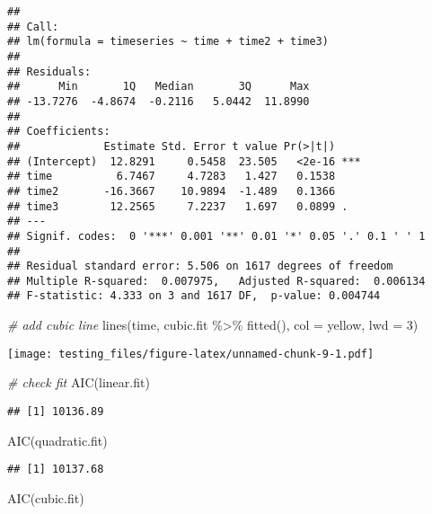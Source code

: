 \documentclass[
]{article}
\newenvironment{Shaded}{\begin{snugshade}}{\end{snugshade}}
\newcommand{\AttributeTok}[1]{\textcolor[rgb]{0.77,0.63,0.00}{#1}}
\newcommand{\CommentTok}[1]{\textcolor[rgb]{0.56,0.35,0.01}{\textit{#1}}}
\newcommand{\DecValTok}[1]{\textcolor[rgb]{0.00,0.00,0.81}{#1}}
\newcommand{\FunctionTok}[1]{\textcolor[rgb]{0.00,0.00,0.00}{#1}}
\newcommand{\NormalTok}[1]{#1}
\newcommand{\SpecialCharTok}[1]{\textcolor[rgb]{0.00,0.00,0.00}{#1}}
\newcommand{\StringTok}[1]{\textcolor[rgb]{0.31,0.60,0.02}{#1}}
\begin{document}
\begin{verbatim}
## 
## Call:
## lm(formula = timeseries ~ time + time2 + time3)
## 
## Residuals:
##      Min       1Q   Median       3Q      Max 
## -13.7276  -4.8674  -0.2116   5.0442  11.8990 
## 
## Coefficients:
##             Estimate Std. Error t value Pr(>|t|)    
## (Intercept)  12.8291     0.5458  23.505   <2e-16 ***
## time          6.7467     4.7283   1.427   0.1538    
## time2       -16.3667    10.9894  -1.489   0.1366    
## time3        12.2565     7.2237   1.697   0.0899 .  
## ---
## Signif. codes:  0 '***' 0.001 '**' 0.01 '*' 0.05 '.' 0.1 ' ' 1
## 
## Residual standard error: 5.506 on 1617 degrees of freedom
## Multiple R-squared:  0.007975,   Adjusted R-squared:  0.006134 
## F-statistic: 4.333 on 3 and 1617 DF,  p-value: 0.004744
\end{verbatim}

\begin{Shaded}
\begin{Highlighting}[]
\CommentTok{\# add cubic line}
\FunctionTok{lines}\NormalTok{(time, }
\NormalTok{      cubic.fit }\SpecialCharTok{\%\textgreater{}\%} \FunctionTok{fitted}\NormalTok{(),}
      \AttributeTok{col =} \StringTok{\textquotesingle{}yellow\textquotesingle{}}\NormalTok{,}
      \AttributeTok{lwd =} \DecValTok{3}\NormalTok{)}
\end{Highlighting}
\end{Shaded}

\texttt{[image: testing\_files/figure-latex/unnamed-chunk-9-1.pdf]}

\begin{Shaded}
\begin{Highlighting}[]
\CommentTok{\# check fit}
\FunctionTok{AIC}\NormalTok{(linear.fit) }
\end{Highlighting}
\end{Shaded}

\begin{verbatim}
## [1] 10136.89
\end{verbatim}

\begin{Shaded}
\begin{Highlighting}[]
\FunctionTok{AIC}\NormalTok{(quadratic.fit)}
\end{Highlighting}
\end{Shaded}

\begin{verbatim}
## [1] 10137.68
\end{verbatim}

\begin{Shaded}
\begin{Highlighting}[]
\FunctionTok{AIC}\NormalTok{(cubic.fit)}
\end{Highlighting}
\end{Shaded}
\end{document}
